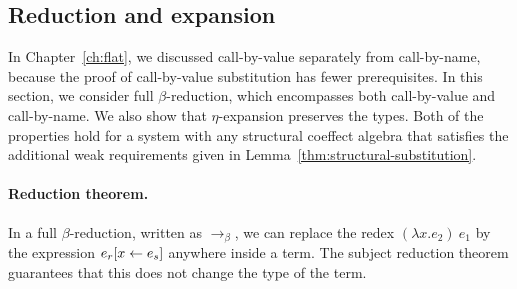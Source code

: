 
\subsection{Reduction and expansion}
\label{sec:struct-syntactic-thms}

In Chapter~\ref{ch:flat}, we discussed call-by-value separately from call-by-name, because the
proof of call-by-value substitution has fewer prerequisites. In this section, we consider full
$\beta$-reduction, which encompasses both call-by-value and call-by-name. We also show that
$\eta$-expansion preserves the types. Both of the properties hold for a system with any
structural coeffect algebra that satisfies the additional weak requirements given in Lemma~\ref{thm:structural-substitution}.

\paragraph{Reduction theorem.} In a full $\beta$-reduction,
written as $\rightarrow_\beta$, we can replace the redex $(\lambda x.e_2)~e_1$ by the
expression $e_r[x \leftarrow e_s]$ anywhere inside a term. The subject reduction theorem
guarantees that this does not change the type of the term.

